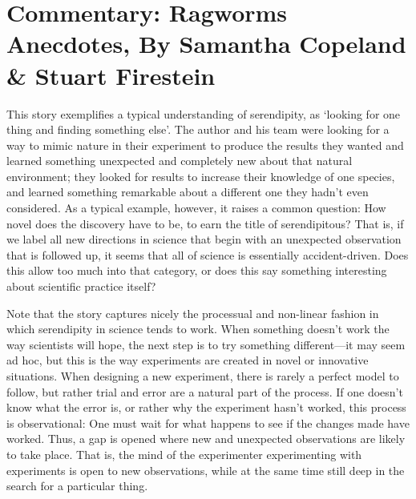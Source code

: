 \documentclass[authordate, empirical]{jote-new-article}
\author[1]{\mbox{Samantha Copeland\orcid{0000-0002-6946-7165}}}
\affil[1]{Delft University of Technology}
\author[2]{\mbox{Stuart Firestein\orcid{0000-0003-1774-5853}}}
\affil[2]{Columbia University}
\begin{document}
\begin{frontmatter}
  \maketitle
  \begin{abstract}
    \printabstracttext
  \end{abstract}
\end{frontmatter}


	\section{Commentary: Ragworms Anecdotes, By Samantha Copeland \& Stuart Firestein}



	This story exemplifies a typical understanding of serendipity, as ‘looking for one thing and finding something else'. The author and his team were looking for a way to mimic nature in their experiment to produce the results they wanted and learned something unexpected and completely new about that natural environment; they looked for results to increase their knowledge of one species, and learned something remarkable about a different one they hadn't even considered. As a typical example, however, it raises a common question: How novel does the discovery have to be, to earn the title of serendipitous? That is, if we label all new directions in science that begin with an unexpected observation that is followed up, it seems that all of science is essentially accident-driven. Does this allow too much into that category, or does this say something interesting about scientific practice itself?



	Note that the story captures nicely the processual and non-linear fashion in which serendipity in science tends to work. When something doesn't work the way scientists will hope, the next step is to try something different—it may seem ad hoc, but this is the way experiments are created in novel or innovative situations. When designing a new experiment, there is rarely a perfect model to follow, but rather trial and error are a natural part of the process. If one doesn't know what the error is, or rather why the experiment hasn't worked, this process is observational: One must wait for what happens to see if the changes made have worked. Thus, a gap is opened where new and unexpected observations are likely to take place. That is, the mind of the experimenter experimenting with experiments is open to new observations, while at the same time still deep in the search for a particular thing.
\end{document}
